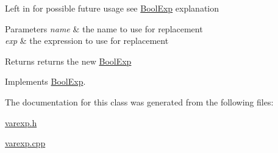Left in for possible future usage see \mbox{\hyperlink{classBoolExp}{Bool\+Exp}} explanation 
\begin{DoxyParams}{Parameters}
{\em name} & the name to use for replacement \\
\hline
{\em exp} & the expression to use for replacement \\
\hline
\end{DoxyParams}
\begin{DoxyReturn}{Returns}
returns the new \mbox{\hyperlink{classBoolExp}{Bool\+Exp}} 
\end{DoxyReturn}


Implements \mbox{\hyperlink{classBoolExp_a6448b7121c238759cc9cc8e48d6f8773}{Bool\+Exp}}.



The documentation for this class was generated from the following files\+:\begin{DoxyCompactItemize}
\item 
\mbox{\hyperlink{varexp_8h}{varexp.\+h}}\item 
\mbox{\hyperlink{varexp_8cpp}{varexp.\+cpp}}\end{DoxyCompactItemize}
